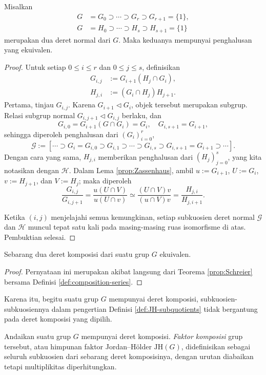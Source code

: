 \begin{theorem}\label{prop:Schreier}
	Misalkan
	\begin{align*}
		G & = G_0 \supset \cdots \supset G_r \supset G_{r+1} = \{1\}, \\
		G & = H_0 \supset \cdots \supset H_s \supset H_{s+1} = \{1\}
	\end{align*}
	merupakan dua deret normal dari $G$. Maka keduanya mempunyai penghalusan yang ekuivalen.
\end{theorem}
\begin{proof}
	Untuk setiap $0 \leq i \leq r$ dan $0 \leq j \leq s$, definisikan
	\begin{align*}
		G_{i,j} & := G_{i+1} (H_j \cap G_i), \\
		H_{j,i} & := (G_i \cap H_j) H_{j+1}.
	\end{align*}
	Pertama, tinjau $G_{i,j}$. Karena $G_{i+1} \lhd G_i$, objek tersebut merupakan subgrup. Relasi subgrup normal $G_{i, j+1} \lhd G_{i,j}$ berlaku, dan
	\[ G_{i,0} = G_{i+1} (G \cap G_i) = G_i, \quad G_{i,s+1} = G_{i+1}, \]
	sehingga diperoleh penghalusan dari $(G_i)_{i=0}^r$,
	\[ \mathcal{G} := \left[ \cdots \supset G_i = G_{i, 0} \supset G_{i, 1} \supset \cdots \supset G_{i, s} \supset G_{i, s+1}= G_{i+1} \supset \cdots \right] . \]
	Dengan cara yang sama, $H_{j, i}$ memberikan penghalusan dari $(H_j)_{j=0}^s$, yang kita notasikan dengan $\mathcal{H}$. Dalam Lema \ref{prop:Zassenhaus}, ambil $u := G_{i+1}$, $U := G_i$, $v := H_{j+1}$, dan $V := H_j$; maka diperoleh
	\[ \dfrac{G_{i,j}}{G_{i,j+1}} = \dfrac{u(U \cap V)}{u(U \cap v)} \simeq \dfrac{(U \cap V)v}{(u \cap V)v} = \dfrac{H_{j,i}}{H_{j,i+1}}. \]

	Ketika $(i,j)$ menjelajahi semua kemungkinan, setiap subkuosien deret normal $\mathcal{G}$ dan $\mathcal{H}$ muncul tepat satu kali pada masing-masing ruas isomorfisme di atas. Pembuktian selesai.
\end{proof}

\begin{theorem}\label{prop:JH-group}
	Sebarang dua deret komposisi dari suatu grup $G$ ekuivalen.
\end{theorem}
\begin{proof}
	Pernyataan ini merupakan akibat langsung dari Teorema \ref{prop:Schreier} bersama Definisi \ref{def:composition-series}.
\end{proof}

Karena itu, begitu suatu grup $G$ mempunyai deret komposisi, subkuosien-subkuosiennya dalam pengertian Definisi \ref{def:JH-subquotients} tidak bergantung pada deret komposisi yang dipilih.
\begin{definition}
	Andaikan suatu grup $G$ mempunyai deret komposisi. \emph{Faktor komposisi} grup tersebut, atau himpunan faktor Jordan--Hölder $\text{JH}(G)$, didefinisikan sebagai seluruh subkuosien dari sebarang deret komposisinya, dengan urutan diabaikan tetapi multiplikitas diperhitungkan.
\end{definition}

